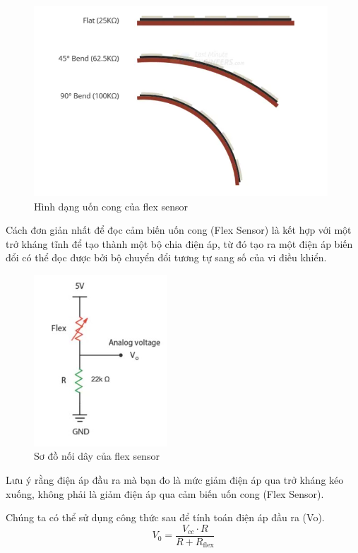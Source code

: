 \begin{figure}[H]
    \centering
    \includegraphics[width=11cm]{Images/Theoretical basis/flex sensor 1.png}
\caption{Hình dạng uốn cong của flex sensor}
\end{figure}


\indent Cách đơn giản nhất để đọc cảm biến uốn cong (Flex Sensor) là kết hợp với một trở kháng tĩnh để tạo thành một bộ chia điện áp, từ đó tạo ra một điện áp biến đổi có thể đọc được bởi bộ chuyển đổi tương tự sang số của vi điều khiển.

\begin{figure}[H]
    \centering
    \includegraphics[width=5cm]{Images/Theoretical basis/flex sensor 2.jpg}
\caption{Sơ đồ nối dây của flex sensor}
\end{figure}

\indent Lưu ý rằng điện áp đầu ra mà bạn đo là mức giảm điện áp qua trở kháng kéo xuống, không phải là giảm điện áp qua cảm biến uốn cong (Flex Sensor).

\indent Chúng ta có thể sử dụng công thức sau để tính toán điện áp đầu ra (Vo).
\[ V_0 = \frac{V_{cc} \cdot R}{R + R_{\text{flex}}} \]

